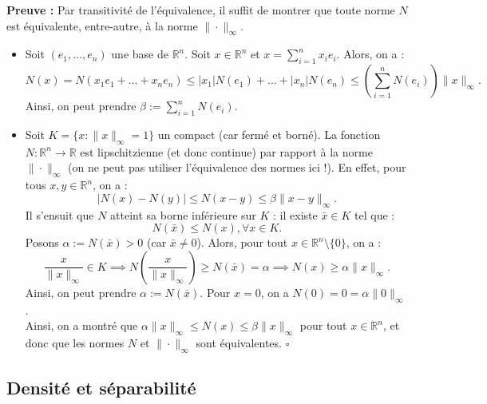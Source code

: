 \documentclass{article}
\begin{document}
\noindent\textbf{Preuve :} Par transitivité de l'équivalence, il suffit de montrer que toute norme $N$ est équivalente, entre-autre, à la norme $\| \cdot \|_\infty$.\\
\begin{itemize}
    \item Soit $(e_1, \ldots, e_n)$ une base de $\mathbb{R}^n$. Soit $x \in \mathbb{R}^n$ et $x = \sum_{i=1}^{n} x_i e_i$. Alors, on a :\\
    $$N(x) = N(x_1 e_1 + \ldots + x_n e_n) \leq |x_1| N(e_1) + \ldots + |x_n| N(e_n) \leq (\sum_{i=1}^{n} N(e_i)) \|x\|_\infty.$$
    Ainsi, on peut prendre $\beta := \sum_{i=1}^{n} N(e_i)$.
    \item Soit $K = \{ x : \|x\|_\infty = 1 \}$ un compact (car fermé et borné). La fonction $N : \mathbb{R}^n \to \mathbb{R}$ est lipschitzienne (et donc continue) par rapport à la norme $\| \cdot \|_\infty$ (on ne peut pas utiliser l'équivalence des normes ici !). En effet, pour tous $x,y \in \mathbb{R}^n$, on a :
    $$|N(x) - N(y)| \leq N(x-y) \leq \beta \|x-y\|_\infty.$$
    Il s'ensuit que $N$ atteint sa borne inférieure sur $K$ : il existe $\bar x \in K$ tel que :
    $$N(\bar x) \leq N(x), \forall x \in K.$$
    Posons $\alpha := N(\bar x) > 0$ (car $\bar x \neq 0$). Alors, pour tout $x \in \mathbb{R}^n \setminus \{0\}$, on a :
    $$\frac{x}{\|x\|_\infty} \in K \implies N\left(\frac{x}{\|x\|_\infty}\right) \geq N(\bar x) = \alpha \implies N(x) \geq \alpha \|x\|_\infty.$$
    Ainsi, on peut prendre $\alpha := N(\bar x)$.
    Pour $x = 0$, on a $N(0) = 0 = \alpha \|0\|_\infty$.\\
    Ainsi, on a montré que $\alpha \|x\|_\infty \leq N(x) \leq \beta \|x\|_\infty$ pour tout $x \in \mathbb{R}^n$, et donc que les normes $N$ et $\| \cdot \|_\infty$ sont équivalentes. \hfill $\square$
\end{itemize}

\subsection{Densité et séparabilité}


\end{document}
